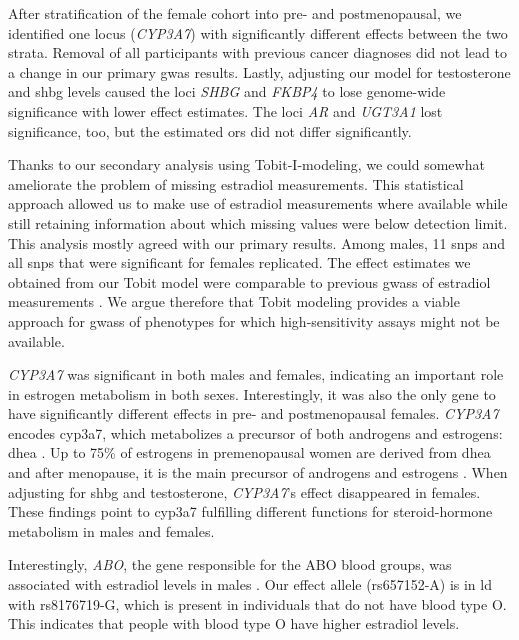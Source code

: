 \documentclass[draft]{scrbook}
\begin{document}
After stratification of the female cohort into pre- and postmenopausal, we identified one locus (\textit{CYP3A7}) with significantly different effects between the two strata.
Removal of all participants with previous cancer diagnoses did not lead to a change in our primary \gls{gwas} results.
Lastly, adjusting our model for testosterone and \gls{shbg} levels caused the loci \textit{SHBG} and \textit{FKBP4} to lose genome-wide significance with lower effect estimates.
The loci \textit{AR} and \textit{UGT3A1} lost significance, too, but the estimated \glspl{or} did not differ significantly.

Thanks to our secondary analysis using Tobit-I-modeling, we could somewhat ameliorate the problem of missing estradiol measurements.
This statistical approach allowed us to make use of estradiol measurements where available while still retaining information about which missing values were below detection limit.
This analysis mostly agreed with our primary results.
Among males, 11 \glspl{snp} and all \glspl{snp} that were significant for females replicated.
The effect estimates we obtained from our Tobit model were comparable to previous \glspl{gwas} of estradiol measurements \cite{Prescott2012f, Eriksson2018b,Pott2019e}.
We argue therefore that Tobit modeling provides a viable approach for \glspl{gwas} of phenotypes for which high-sensitivity assays might not be available.

\textit{CYP3A7} was significant in both males and females, indicating an important role in estrogen metabolism in both sexes.
Interestingly, it was also the only gene to have significantly different effects in pre- and postmenopausal females.
\textit{CYP3A7} encodes \gls{cyp3a7}, which metabolizes a precursor of both androgens and estrogens: \gls{dhea} \cite{Ohmori1998}.
Up to 75\% of estrogens in premenopausal women are derived from \gls{dhea} and after menopause, it is the main precursor of androgens and estrogens \cite{Simpson2001}.
When adjusting for \gls{shbg} and testosterone, \textit{CYP3A7}'s effect disappeared in females.
These findings point to \gls{cyp3a7} fulfilling different functions for steroid-hormone metabolism in males and females.

Interestingly, \textit{ABO}, the gene responsible for the ABO blood groups, was associated with estradiol levels in males \cite{Ogasawara1996}.
Our effect allele (rs657152-A) is in \gls{ld} with rs8176719-G, which is present in individuals that do not have blood type O.
This indicates that people with blood type O have higher estradiol levels.
\end{document}
